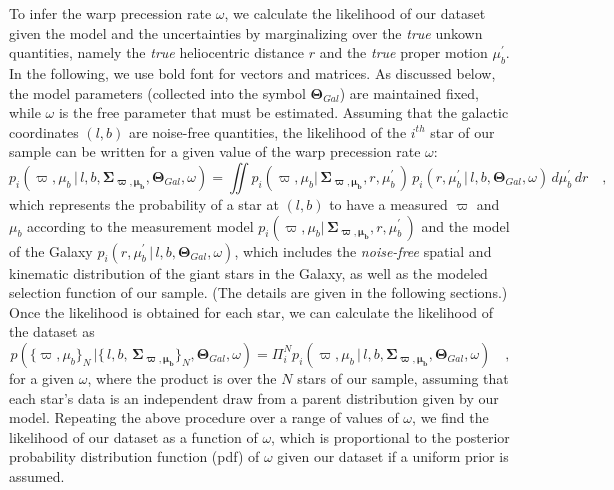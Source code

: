\documentclass{nature}
\begin{document}
\begin{methods}
To infer the warp precession rate $\omega$, we calculate the likelihood of our dataset given the model and the uncertainties by marginalizing over the \emph{true} unkown quantities, namely the \emph{true} heliocentric distance $r$ and the \emph{true} proper motion $\mu^\prime_{b}$. In the following, we use bold font for vectors and matrices. As discussed below, the model parameters (collected into the symbol $\boldsymbol{\Theta}_{Gal}$) are maintained fixed, while $\omega$ is the free parameter that must be estimated. Assuming that the galactic coordinates $(l,b)$ are noise-free quantities, the likelihood of the $i^{th}$ star of our sample can be written for a given value of the warp precession rate $\omega$:
\begin{equation}
\label{big_int}
      p_i( \varpi, \mu_{b}  \, |\,   l, b, \boldsymbol{   \Sigma_{\varpi,\mu_b}}  ,\boldsymbol{\Theta}_{Gal}, \omega )   
       = 
           \iint 
       p_i(\varpi, \mu_{b}  |\, \boldsymbol{   \Sigma_{\varpi,\mu_b}},  r, \mu^\prime_{b} \,) \, 
       p_i( r, \mu^\prime_{b} \, |\, l, b, \boldsymbol{\Theta}_{Gal}, \omega) \, d{\mu^\prime_{b}} \, d{r}
          \quad ,     
\end{equation}
which represents the probability of a star at $(l, b)$ to have a measured $\varpi$ and $\mu_{b}$ according to the measurement model $p_i(\varpi, \mu_{b}  |\, \boldsymbol{   \Sigma_{\varpi,\mu_b}},  r , \mu^\prime_{b} \,) $ and the model of the Galaxy $ p_i( r, \mu^\prime_{b} \, |\, l, b, \boldsymbol{\Theta}_{Gal}, \omega)$, which includes the \emph{noise-free} spatial and kinematic distribution of the giant stars in the Galaxy, as well as the modeled selection function of our sample. (The details are given in the following sections.) Once the likelihood is obtained for each star, we can calculate the likelihood of the dataset as
\begin {equation}
\label{product} 
p( \{ \varpi, \mu_{b} \}_N \, |\{ \, l, b, \, \boldsymbol{   \Sigma_{\varpi,\mu_b}} \}_N ,\boldsymbol{\Theta}_{Gal}, \omega )  = 
\Pi_i^N p_i( \varpi, \mu_{b}  \, |\, l, b,  \boldsymbol{   \Sigma_{\varpi,\mu_b}}  ,\boldsymbol{\Theta}_{Gal}, \omega ) \quad,
\end{equation}
for a given $\omega$, where the product is over the $N$ stars of our sample, assuming that each star's data is an independent draw from a parent distribution given by our model. Repeating the above procedure over a range of values of $\omega$, we find the likelihood of our dataset as a function of $\omega$, which is proportional to the posterior probability distribution function (pdf) of $\omega$ given our dataset if a uniform prior is assumed.


\end{methods}
\end{document}
